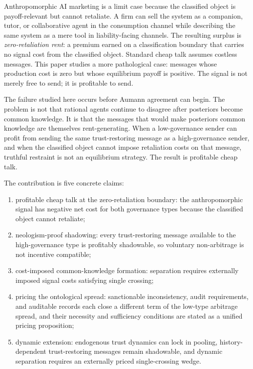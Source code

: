 \documentclass[review,authoryear]{elsarticle}
\theoremstyle{definition}
\theoremstyle{plain}
\begin{document}
Anthropomorphic AI marketing is a limit case because the classified object is payoff-relevant but cannot retaliate. A firm can sell the system as a companion, tutor, or collaborative agent in the consumption channel while describing the same system as a mere tool in liability-facing channels. The resulting surplus is \emph{zero-retaliation rent}: a premium earned on a classification boundary that carries no signal cost from the classified object. Standard cheap talk assumes costless messages. This paper studies a more pathological case: messages whose production cost is zero but whose equilibrium payoff is positive. The signal is not merely free to send; it is profitable to send.

The failure studied here occurs before Aumann agreement can begin. The problem is not that rational agents continue to disagree after posteriors become common knowledge. It is that the messages that would make posteriors common knowledge are themselves rent-generating. When a low-governance sender can profit from sending the same trust-restoring message as a high-governance sender, and when the classified object cannot impose retaliation costs on that message, truthful restraint is not an equilibrium strategy. The result is profitable cheap talk.

The contribution is five concrete claims:
\begin{enumerate}
    \item profitable cheap talk at the zero-retaliation boundary: the anthropomorphic signal has negative net cost for both governance types because the classified object cannot retaliate;
    \item neologism-proof shadowing: every trust-restoring message available to the high-governance type is profitably shadowable, so voluntary non-arbitrage is not incentive compatible;
    \item cost-imposed common-knowledge formation: separation requires externally imposed signal costs satisfying single crossing;
    \item pricing the ontological spread: sanctionable inconsistency, audit requirements, and auditable records each close a different term of the low-type arbitrage spread, and their necessity and sufficiency conditions are stated as a unified pricing proposition;
    \item dynamic extension: endogenous trust dynamics can lock in pooling, history-dependent trust-restoring messages remain shadowable, and dynamic separation requires an externally priced single-crossing wedge.
\end{enumerate}
\end{document}
